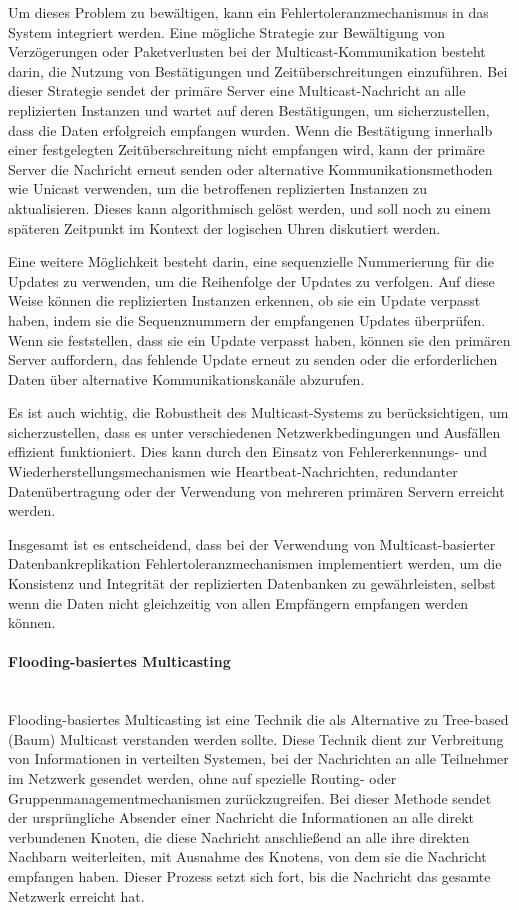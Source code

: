 \documentclass[../vs-script-first-v01.tex]{subfiles}
\begin{document}
Um dieses Problem zu bewältigen, kann ein Fehlertoleranzmechanismus in das System integriert werden. Eine mögliche Strategie zur Bewältigung von Verzögerungen oder Paketverlusten bei der Multicast-Kommunikation besteht darin, die Nutzung von Bestätigungen und Zeitüberschreitungen einzuführen. Bei dieser Strategie sendet der primäre Server eine Multicast-Nachricht an alle replizierten Instanzen und wartet auf deren Bestätigungen, um sicherzustellen, dass die Daten erfolgreich empfangen wurden. Wenn die Bestätigung innerhalb einer festgelegten Zeitüberschreitung nicht empfangen wird, kann der primäre Server die Nachricht erneut senden oder alternative Kommunikationsmethoden wie Unicast verwenden, um die betroffenen replizierten Instanzen zu aktualisieren. Dieses kann algorithmisch gelöst werden, und soll noch zu einem späteren Zeitpunkt im Kontext der logischen Uhren diskutiert werden. 

Eine weitere Möglichkeit besteht darin, eine sequenzielle Nummerierung für die Updates zu verwenden, um die Reihenfolge der Updates zu verfolgen. Auf diese Weise können die replizierten Instanzen erkennen, ob sie ein Update verpasst haben, indem sie die Sequenznummern der empfangenen Updates überprüfen. Wenn sie feststellen, dass sie ein Update verpasst haben, können sie den primären Server auffordern, das fehlende Update erneut zu senden oder die erforderlichen Daten über alternative Kommunikationskanäle abzurufen.

Es ist auch wichtig, die Robustheit des Multicast-Systems zu berücksichtigen, um sicherzustellen, dass es unter verschiedenen Netzwerkbedingungen und Ausfällen effizient funktioniert. Dies kann durch den Einsatz von Fehlererkennungs- und Wiederherstellungsmechanismen wie Heartbeat-Nachrichten, redundanter Datenübertragung oder der Verwendung von mehreren primären Servern erreicht werden.

Insgesamt ist es entscheidend, dass bei der Verwendung von Multicast-basierter Datenbankreplikation Fehlertoleranzmechanismen implementiert werden, um die Konsistenz und Integrität der replizierten Datenbanken zu gewährleisten, selbst wenn die Daten nicht gleichzeitig von allen Empfängern empfangen werden können.
\paragraph{Flooding-basiertes Multicasting}\mbox{}\\
Flooding-basiertes Multicasting ist eine Technik die als Alternative zu Tree-based (Baum) Multicast verstanden werden sollte. Diese Technik dient zur Verbreitung von Informationen in verteilten Systemen, bei der Nachrichten an alle Teilnehmer im Netzwerk gesendet werden, ohne auf spezielle Routing- oder Gruppenmanagementmechanismen zurückzugreifen. Bei dieser Methode sendet der ursprüngliche Absender einer Nachricht die Informationen an alle direkt verbundenen Knoten, die diese Nachricht anschließend an alle ihre direkten Nachbarn weiterleiten, mit Ausnahme des Knotens, von dem sie die Nachricht empfangen haben. Dieser Prozess setzt sich fort, bis die Nachricht das gesamte Netzwerk erreicht hat.
\end{document}
